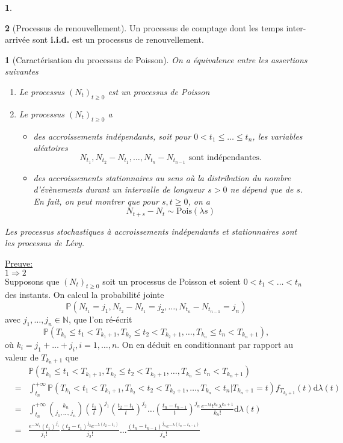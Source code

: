 \documentclass[8pt,notheorems]{beamer}
\newtheorem{prop}{\translate{Proposition}}
\theoremstyle{definition}
\theoremstyle{example}
\theoremstyle{mystyle}
\newtheorem{remark}{\translate{Remarque}}
\theoremstyle{plain}
\begin{document}
\begin{frame}[allowframebreaks]
\begin{remark}
\end{remark}
\begin{remark}[Processus de renouvellement]
Un processus de comptage dont les temps inter-arrivée sont \textbf{i.i.d.} est un processus de renouvellement.
\end{remark}
\begin{prop}[Caractérisation du processus de Poisson]
On a équivalence entre les assertions suivantes
\begin{enumerate}
\item Le processus $(N_t)_{t\geq 0}$ est un processus de Poisson
\item Le processus $(N_t)_{t\geq 0}$ a
\begin{itemize}
\item[(i)] des accroissements indépendants, soit pour $0<t_1\leq\ldots\leq t_n$, les variables aléatoires
$$N_{t_1},N_{t_2}-N_{t_1},\ldots,N_{t_{n}}-N_{t_{n-1}}\text{ sont indépendantes.}$$
\item[(ii)] des accroissements stationnaires au sens où la distribution du nombre d'évènements durant un intervalle de longueur $s>0$ ne dépend que de $s$. En fait, on peut montrer que pour $s,t\geq0$, on a
$$
N_{t+s}-N_t\sim\text{Pois}(\lambda s)
$$
\end{itemize}
\end{enumerate}
Les processus stochastiques à accroissements indépendants et stationnaires sont les processus de Lévy. 
\end{prop}
\underline{Preuve:}\\
\underline{$1 \Rightarrow 2$}\\
Supposons que $(N_t)_{t\geq0}$ soit un processus de Poisson et soient $0<t_1<\ldots <t_n$ des instants. On calcul la probabilité jointe 
$$
\mathbb{P}\left(N_{t_1} = j_1, N_{t_2}-N_{t_1} = j_2,\ldots, N_{t_n}-N_{t_{n-1}} = j_n\right)
$$
avec $j_1,\ldots, j_n\in \mathbb{N}$, que l'on ré-écrit
$$
\mathbb{P}\left(T_{k_1}\leq t_1<T_{k_1+1}, T_{k_2}\leq t_2<T_{k_2+1},\ldots, T_{k_n} \leq t_n<T_{k_n+1}\right),
$$
où $k_i = j_1 + \ldots +j_i, i = 1,\ldots, n$. On en déduit en conditionnant par rapport au valeur de $T_{k_n+1}$ que
\begin{eqnarray*}
&&\mathbb{P}\left(T_{k_1}\leq t_1<T_{k_1+1}, T_{k_2}\leq t_2<T_{k_2+1},\ldots, T_{k_n}\leq t_n<T_{k_n+1}\right)\\
&=&\int_{t_n}^{+\infty}\mathbb{P}\left(T_{k_1}<t_1<T_{k_1+1}, T_{k_2}<t_2<T_{k_2+1},\ldots, T_{k_n}<t_n|T_{k_n +1}=t\right)f_{T_{k_n+1}}(t)\text{d}\lambda(t)\\
&=& \int_{t_n}^{+\infty}\binom{k_n}{j_1,\ldots, j_n}\left(\frac{t_1}{t}\right)^{j_1}\left(\frac{t_2-t_1}{t}\right)^{j_2}\ldots \left(\frac{t_n-t_{n-1}}{t}\right)^{j_n}\frac{e^{-\lambda t}t^{k_n}\lambda^{k_n + 1}}{k_n!}\text{d}\lambda(t)\\
&=&\frac{e^{-\lambda t_1}\left(t_1\right)^{j_1}}{j_1!}\frac{\left(t_2-t_1\right)^{j_2}e^{-\lambda(t_2 - t_1)}}{j_2!}\ldots \frac{\left(t_n-t_{n-1}\right)^{j_n}e^{-\lambda(t_n - t_{n-1})}}{j_n!}
\end{eqnarray*}



\end{frame}
\end{document}
